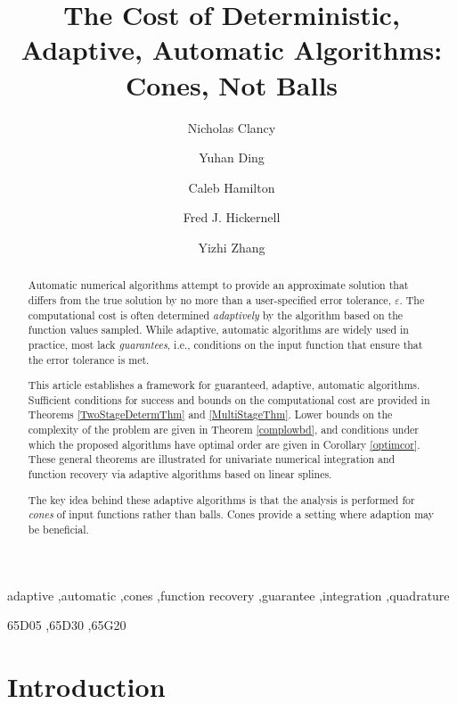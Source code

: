 \documentclass[]{elsarticle}
\theoremstyle{definition}
\theoremstyle{remark}
\begin{document}
\begin{frontmatter}

\title{The Cost of Deterministic, Adaptive, Automatic Algorithms:  Cones, Not Balls}
\author{Nicholas Clancy}
\author{Yuhan Ding}
\author{Caleb Hamilton}
\author{Fred J. Hickernell}
\author{Yizhi Zhang}
\address{Room E1-208, Department of Applied Mathematics, Illinois Institute of Technology,\\ 10 W.\ 32$^{\text{nd}}$ St., Chicago, IL 60616}

\begin{abstract} 
Automatic numerical algorithms attempt to provide an approximate solution that differs from the true solution by no more than a user-specified error tolerance, $\varepsilon$. The computational cost is often determined \emph{adaptively} by the algorithm based on the function values sampled. While adaptive, automatic algorithms are widely used in practice, most lack \emph{guarantees}, i.e., conditions on the input function that ensure that the error tolerance is met. 

This article establishes a framework for guaranteed, adaptive, automatic algorithms. Sufficient conditions for success and bounds on the computational cost are provided in Theorems \ref{TwoStageDetermThm} and \ref{MultiStageThm}.  Lower bounds on the complexity of the problem are given in Theorem \ref{complowbd}, and conditions under which the proposed algorithms have optimal order are given in Corollary \ref{optimcor}. These general theorems are illustrated for univariate numerical integration and function recovery via adaptive algorithms based on linear splines.  

The key idea behind these adaptive algorithms is that the analysis is performed for \emph{cones} of input functions rather than balls.  Cones provide a setting where adaption may be beneficial.
\end{abstract}

\begin{keyword}
adaptive \sep automatic \sep cones \sep function recovery \sep guarantee \sep integration \sep quadrature

\MSC[2010] 65D05 \sep 65D30 \sep 65G20

\end{keyword}
\end{frontmatter}

\section{Introduction}
\end{document}
